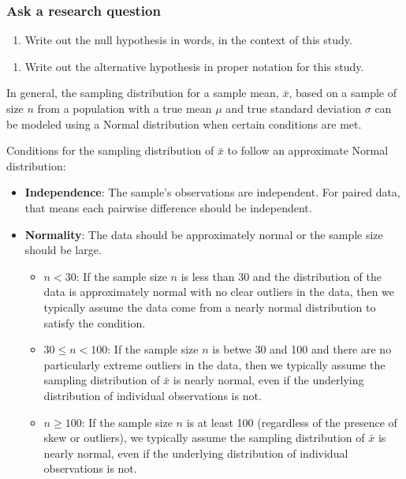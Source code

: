 \documentclass[
]{report}
\providecommand{\tightlist}{%
  \setlength{\itemsep}{0pt}\setlength{\parskip}{0pt}}
\begin{document}
\subsubsection*{Ask a research question}\label{ask-a-research-question-5}

\begin{enumerate}
\def\labelenumi{\arabic{enumi}.}
\setcounter{enumi}{2}
\tightlist
\item
  Write out the null hypothesis in words, in the context of this study.
\end{enumerate}

\vspace{0.8in}

\begin{enumerate}
\def\labelenumi{\arabic{enumi}.}
\setcounter{enumi}{3}
\tightlist
\item
  Write out the alternative hypothesis in proper notation for this study.
\end{enumerate}

\vspace{0.5in}

In general, the sampling distribution for a sample mean, \(\bar{x}\), based on a sample of size \(n\) from a population with a true mean \(\mu\) and true standard deviation \(\sigma\) can be modeled using a Normal distribution when certain conditions are met.

Conditions for the sampling distribution of \(\bar{x}\) to follow an approximate Normal distribution:

\begin{itemize}
\item
  \textbf{Independence}: The sample's observations are independent. For paired data, that means each pairwise difference should be independent.
\item
  \textbf{Normality}: The data should be approximately normal or the sample size should be large.

  \begin{itemize}
  \item
    \(n < 30\): If the sample size \(n\) is less than 30 and the distribution of the data is approximately normal with no clear outliers in the data, then we typically assume the data come from a nearly normal distribution to satisfy the condition.
  \item
    \(30 \leq n < 100\): If the sample size \(n\) is betwe 30 and 100 and there are no particularly extreme outliers in the data, then we typically assume the sampling distribution of \(\bar{x}\) is nearly normal, even if the underlying distribution of individual observations is not.
  \item
    \(n \geq 100\): If the sample size \(n\) is at least 100 (regardless of the presence of skew or outliers), we typically assume the sampling distribution of \(\bar{x}\) is nearly normal, even if the underlying distribution of individual observations is not.
  \end{itemize}
\end{itemize}
\end{document}

